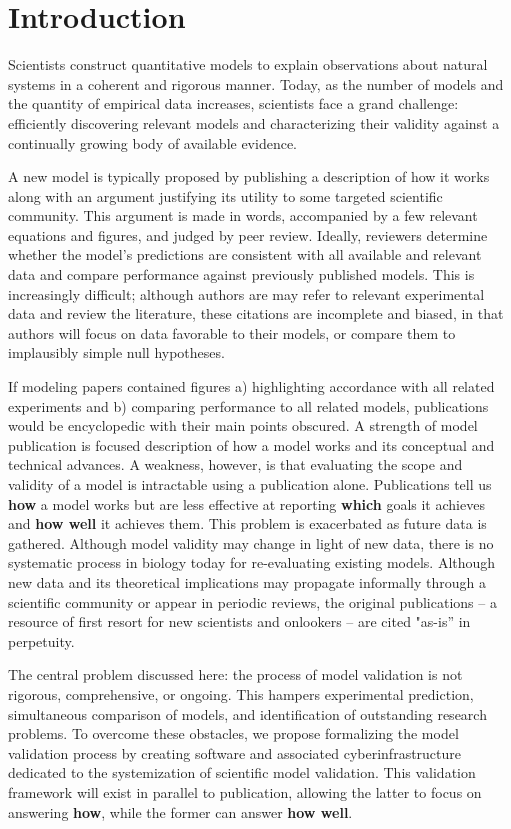 \documentclass[11pt,letterpaper]{article}
\begin{document}
\section{Introduction}
Scientists construct quantitative models to explain observations about natural systems in a coherent and rigorous manner. Today, as the number of models and the quantity of empirical data increases, scientists face a grand challenge: efficiently discovering relevant models and characterizing their validity against a continually growing body of available evidence. 

A new model is typically proposed by publishing a description of how it works along with an argument justifying its utility to some targeted scientific community. This argument is made in words, accompanied by a few relevant equations and figures, and judged by peer review. Ideally, reviewers determine whether the model's predictions are consistent with all available and relevant data and compare performance against previously published models. This is increasingly difficult; although authors are may refer to relevant experimental data and review the literature, these citations are incomplete and biased, in that authors will focus on data favorable to their models, or compare them to implausibly simple null hypotheses.

If modeling papers contained figures a) highlighting accordance with all related experiments and b) comparing performance to all related models, publications would be encyclopedic with their main points obscured. A strength of model publication is focused description of how a model works and its conceptual and technical advances. A weakness, however, is that evaluating the scope and validity of a model is intractable using a publication alone. Publications tell us \textbf{how} a model works but are less effective at reporting \textbf{which} goals it achieves and \textbf{how well} it achieves them. This problem is exacerbated as future data is gathered. Although model validity may change in light of new data, there is no systematic process in biology today for re-evaluating existing models. Although new data and its theoretical implications may propagate informally through a scientific community or appear in periodic reviews, the original publications -- a resource of first resort for new scientists and onlookers -- are cited "as-is'' in perpetuity. 	

The central problem discussed here: the process of model validation is not rigorous, comprehensive, or ongoing. This hampers experimental prediction, simultaneous comparison of models, and identification of outstanding research problems. To overcome these obstacles, we propose formalizing the model validation process by creating software and associated cyberinfrastructure dedicated to the systemization of scientific model validation.  This validation framework will exist in parallel to publication, allowing the latter to focus on answering \textbf{how}, while the former can answer \textbf{how well}. 
\end{document}
